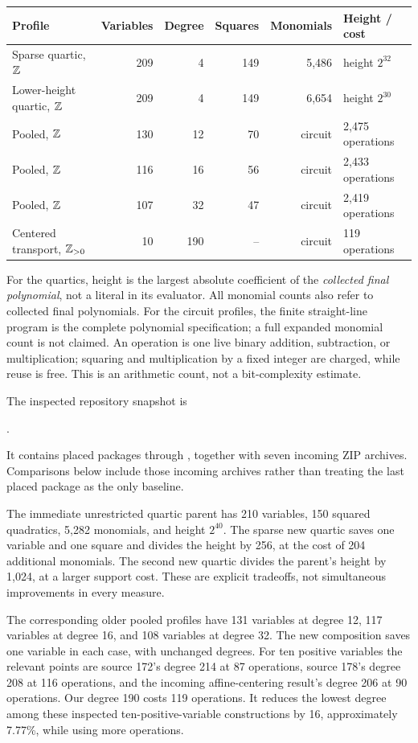 \begin{center}
\small
\begin{tabular}{@{}lrrrrl@{}}
\toprule
Profile & Variables & Degree & Squares & Monomials & Height / cost\\
\midrule
Sparse quartic, \(\mathbb Z\) & 209 & 4 & 149 & 5,486 & height \(2^{32}\)\\
Lower-height quartic, \(\mathbb Z\) & 209 & 4 & 149 & 6,654 & height \(2^{30}\)\\
Pooled, \(\mathbb Z\) & 130 & 12 & 70 & circuit & 2,475 operations\\
Pooled, \(\mathbb Z\) & 116 & 16 & 56 & circuit & 2,433 operations\\
Pooled, \(\mathbb Z\) & 107 & 32 & 47 & circuit & 2,419 operations\\
Centered transport, \(\mathbb Z_{>0}\) & 10 & 190 & -- & circuit & 119 operations\\
\bottomrule
\end{tabular}
\end{center}

For the quartics, height is the largest absolute coefficient of the
\emph{collected final polynomial}, not a literal in its evaluator.
All monomial counts also refer to collected final polynomials. For the
circuit profiles, the finite straight-line program is the complete
polynomial specification; a full expanded monomial count is not claimed.
An operation is one live binary addition, subtraction, or multiplication;
squaring and multiplication by a fixed integer are charged, while reuse is
free. This is an arithmetic count, not a bit-complexity estimate.

The inspected repository snapshot is
\begin{center}\small
{}.
\end{center}
It contains placed packages through , together
with seven incoming ZIP archives. Comparisons below include those incoming
archives rather than treating the last placed package as the only baseline.

The immediate unrestricted quartic parent has 210 variables, 150 squared
quadratics, 5,282 monomials, and height \(2^{40}\). The sparse new quartic
saves one variable and one square and divides the height by 256, at the
cost of 204 additional monomials. The second new quartic divides the
parent's height by 1,024, at a larger support cost. These are explicit
tradeoffs, not simultaneous improvements in every measure.

The corresponding older pooled profiles have 131 variables at degree 12,
117 variables at degree 16, and 108 variables at degree 32. The new composition saves one variable
in each case, with unchanged degrees. For ten positive variables the
relevant points are source 172's degree 214 at 87 operations, source 178's
degree 208 at 116 operations, and the incoming affine-centering result's
degree 206 at 90 operations. Our degree 190 costs 119 operations. It
reduces the lowest degree among these inspected ten-positive-variable
constructions by 16, approximately 7.77\%, while using more operations.

